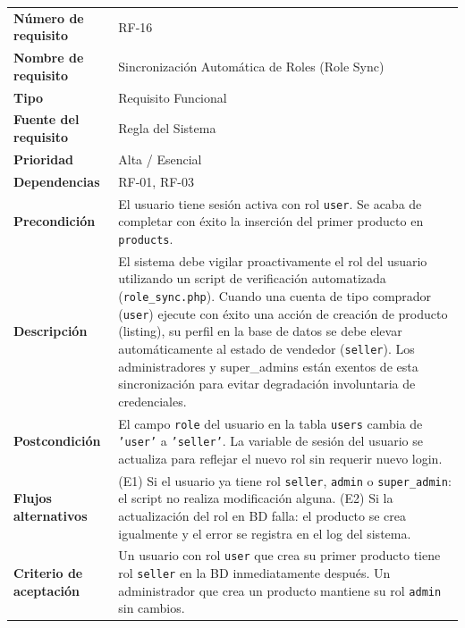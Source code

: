 \documentclass[11pt,a4paper]{report}
\begin{document}
\begin{table}[H]
\centering
\begin{tabularx}{\textwidth}{|l|L|}
\hline
{} \\ \hline
\textbf{Número de requisito} & RF-16 \\ \hline
\textbf{Nombre de requisito} & Sincronización Automática de Roles (Role Sync) \\ \hline
\textbf{Tipo} & Requisito Funcional \\ \hline
\textbf{Fuente del requisito} & Regla del Sistema \\ \hline
\textbf{Prioridad} & Alta / Esencial \\ \hline
\textbf{Dependencias} & RF-01, RF-03 \\ \hline
\textbf{Precondición} & El usuario tiene sesión activa con rol \texttt{user}. Se acaba de completar con éxito la inserción del primer producto en \texttt{products}. \\ \hline
\textbf{Descripción} & El sistema debe vigilar proactivamente el rol del usuario utilizando un script de verificación automatizada (\texttt{role\_sync.php}). Cuando una cuenta de tipo comprador (\texttt{user}) ejecute con éxito una acción de creación de producto (listing), su perfil en la base de datos se debe elevar automáticamente al estado de vendedor (\texttt{seller}). Los administradores y super\_admins están exentos de esta sincronización para evitar degradación involuntaria de credenciales. \\ \hline
\textbf{Postcondición} & El campo \texttt{role} del usuario en la tabla \texttt{users} cambia de \texttt{'user'} a \texttt{'seller'}. La variable de sesión del usuario se actualiza para reflejar el nuevo rol sin requerir nuevo login. \\ \hline
\textbf{Flujos alternativos} & (E1) Si el usuario ya tiene rol \texttt{seller}, \texttt{admin} o \texttt{super\_admin}: el script no realiza modificación alguna. (E2) Si la actualización del rol en BD falla: el producto se crea igualmente y el error se registra en el log del sistema. \\ \hline
\textbf{Criterio de aceptación} & Un usuario con rol \texttt{user} que crea su primer producto tiene rol \texttt{seller} en la BD inmediatamente después. Un administrador que crea un producto mantiene su rol \texttt{admin} sin cambios. \\ \hline
\end{tabularx}
\end{table}
\end{document}
